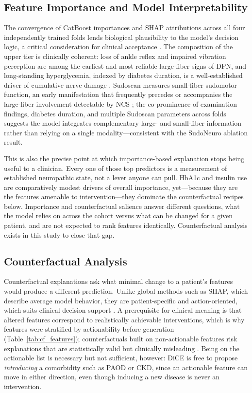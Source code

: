 \documentclass[pdflatex,sn-mathphys-num]{sn-jnl}%
\theoremstyle{thmstyleone}%
\theoremstyle{thmstyletwo}%
\theoremstyle{thmstylethree}%
\begin{document}
\subsection{Feature Importance and Model Interpretability}
The convergence of CatBoost importances and SHAP attributions across all four independently trained
folds lends biological plausibility to the model's decision logic, a critical consideration for
clinical acceptance \cite{rudin2019}. The composition of the upper tier is clinically coherent: loss
of ankle reflex and impaired vibration perception are among the earliest and most reliable
large-fiber signs of DPN, and long-standing hyperglycemia, indexed by diabetes duration, is a
well-established driver of cumulative nerve damage \cite{tesfaye2010diabetic}. Sudoscan measures
small-fiber sudomotor function, an early manifestation that frequently precedes or accompanies the
large-fiber involvement detectable by NCS \cite{casellini2013sudoscan}; the co-prominence of
examination findings, diabetes duration, and multiple Sudoscan parameters across folds suggests the
model integrates complementary large- and small-fiber information rather than relying on a single
modality---consistent with the SudoNeuro ablation result.

This is also the precise point at which importance-based explanation stops being useful to a
clinician. Every one of those top predictors is a measurement of established neuropathic state, not a
lever anyone can pull. HbA1c and insulin use are comparatively modest drivers of overall importance,
yet---because they are the features amenable to intervention---they dominate the counterfactual
recipes below. Importance and counterfactual salience answer different questions, what the model
relies on across the cohort versus what can be changed for a given patient, and are not expected to
rank features identically. Counterfactual analysis exists in this study to close that gap.

\subsection{Counterfactual Analysis}
\label{sec:counterfactual}\label{sec:cf-plausibility}
Counterfactual explanations ask what minimal change to a patient's features would produce a different
prediction. Unlike global methods such as SHAP, which describe average model behavior, they are
patient-specific and action-oriented, which suits clinical decision support \cite{wachter2017}. A
prerequisite for clinical meaning is that altered features correspond to realistically achievable
interventions, which is why features were stratified by actionability before generation
(Table~\ref{tab:cf_features}); counterfactuals built on non-actionable features risk explanations
that are statistically valid but clinically misleading \cite{karimi2020}. Being on the actionable
list is necessary but not sufficient, however: DiCE is free to propose \textit{introducing} a
comorbidity such as PAOD or CKD, since an actionable feature can move in either direction, even
though inducing a new disease is never an intervention.
\end{document}
